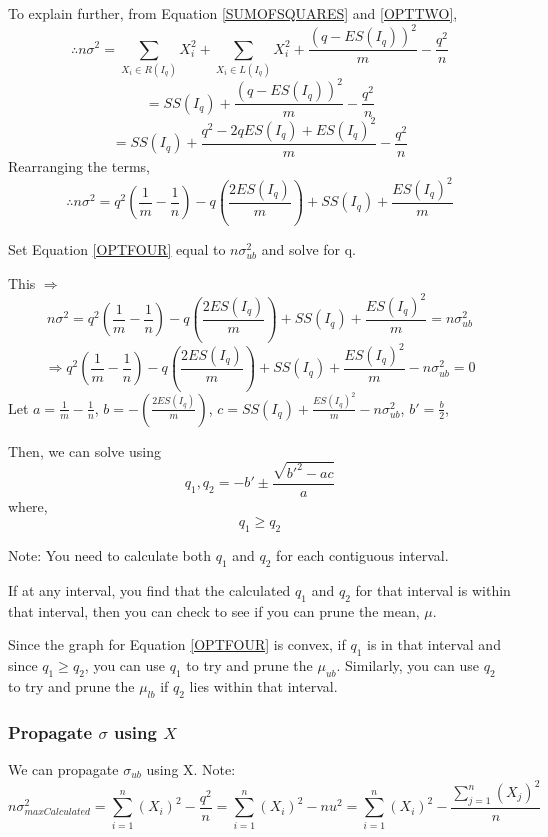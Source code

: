 \documentclass[a4paper,12pt]{article}
\begin{document}
To explain further, from Equation \ref{SUMOFSQUARES} and \ref{OPTTWO}, 
$$ \therefore n\sigma^2 = \sum_{X_{i} \in R(I_{q})}X_{i}^2 + \sum_{X_{i} \in L(I_{q})}X_{i}^2 + \frac{(q - ES(I_{q}))^2}{m}  - \frac{q^2}{n} 
$$
$$ = SS(I_{q}) + \frac{(q - ES(I_{q}))^2}{m}  - \frac{q^2}{n} 
$$
$$ = SS(I_{q}) + \frac{q^2 - 2qES(I_{q}) + ES(I_{q})^2}{m} - \frac{q^2}{n}
$$
Rearranging the terms, 
\begin{equation}
\label{OPTFOUR} \therefore n\sigma^2 = q^2(\frac{1}{m} - \frac{1}{n}) - q(\frac{2ES(I_{q})}{m}) +  SS(I_{q})+ \frac{ES(I_{q})^2}{m}
\end{equation}

Set Equation \ref{OPTFOUR} equal to $n\sigma_{ub}^2$ and solve for q. 

This $\Rightarrow$
$$
n\sigma^2 = q^2(\frac{1}{m} - \frac{1}{n}) - q(\frac{2ES(I_{q})}{m}) +  SS(I_{q})+ \frac{ES(I_{q})^2}{m} = n\sigma_{ub}^2
$$
$$ \Rightarrow
q^2(\frac{1}{m} - \frac{1}{n}) - q(\frac{2ES(I_{q})}{m}) +  SS(I_{q})+ \frac{ES(I_{q})^2}{m} - n\sigma_{ub}^2 = 0
$$
Let $a=\frac{1}{m} - \frac{1}{n}$, $b=-(\frac{2ES(I_{q})}{m})$, $c= SS(I_{q})+ \frac{ES(I_{q})^2}{m} - n\sigma_{ub}^2$, $b'=\frac{b}{2}$, 

Then, we can solve using 
$$
q_{1},q_{2}=-b' \pm \frac{\sqrt{b'^2-ac}}{a}
$$
where,
$$
q_{1} \geq q_{2} 
$$

Note: You need to calculate both $q_{1}$ and $q_{2}$ for each contiguous interval. 

If at any interval, you find that the calculated $q_{1}$ and $q_{2}$  for that interval is within that interval, then you can check to see if you can prune the mean, $\mu$. 

Since the graph for Equation \ref{OPTFOUR} is convex, if $q_{1}$ is in that interval and since $q_{1} \geq q_{2}$, you can use $q_{1}$ to try and prune the $\mu_{ub}$. Similarly, you can use $q_{2}$ to try and prune the $\mu_{lb}$ if $q_{2}$ lies within that interval. 

\subsubsection{Propagate $\sigma$ using $X$}
We can propagate $\sigma_{ub}$ using X. 
Note:
\begin{equation}
\label{PRUNESIGMAUSINGX}
n\sigma_{maxCalculated}^2 = \sum_{i=1}^n(X_{i})^2 - \frac{q^2}{n} 
= \sum_{i=1}^n(X_{i})^2 - nu^2 = \sum_{i=1}^n(X_{i})^2 -
\frac{\sum_{j=1}^n(X_{j})^2}{n}
\end{equation} 
\end{document}

